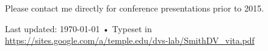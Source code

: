 \documentclass[11pt, letterpaper]{article}
\begin{document}
\vspace{.5cm}
Please contact me directly for conference presentations prior to 2015. 




\vfill{}

\begin{center}
{\scriptsize  Last updated: \today\- •\-
Typeset in \href{http://nitens.org/taraborelli/cvtex}{\XeTeX }\\
\href{https://sites.google.com/a/temple.edu/dvs-lab/SmithDV\_vita.pdf}{https://sites.google.com/a/temple.edu/dvs-lab/SmithDV\_vita.pdf}}
\end{center}
\end{document}
